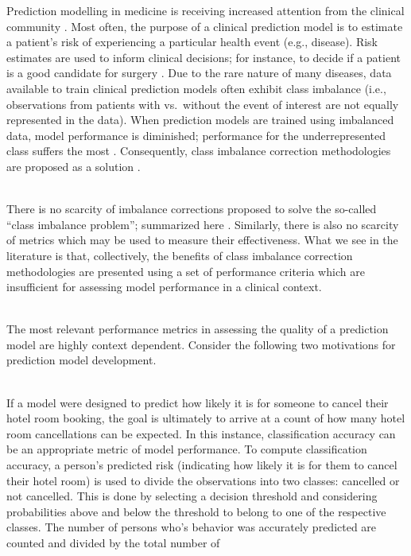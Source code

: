 \documentclass[AMA,STIX1COL,]{WileyNJD-v2}
\begin{document}
Prediction modelling in medicine is receiving increased attention from
the clinical community \citep{sandra}. Most often, the purpose of a
clinical prediction model is to estimate a patient's risk of
experiencing a particular health event (e.g., disease). Risk estimates
are used to inform clinical decisions; for instance, to decide if a
patient is a good candidate for surgery \citep{annals, achilles}. Due to
the rare nature of many diseases, data available to train clinical
prediction models often exhibit class imbalance (i.e., observations from
patients with vs.~without the event of interest are not equally
represented in the data). When prediction models are trained using
imbalanced data, model performance is diminished; performance for the
underrepresented class suffers the most \citep{cip, lp2}. Consequently,
class imbalance correction methodologies are proposed as a solution
\citep{cip, summary_m, lp, summary_h}.\\
\strut \\
There is no scarcity of imbalance corrections proposed to solve the
so-called ``class imbalance problem''; summarized here
\citep{summary_m, lp, summary_h}. Similarly, there is also no scarcity
of metrics which may be used to measure their effectiveness. What we see
in the literature is that, collectively, the benefits of class imbalance
correction methodologies are presented using a set of performance
criteria which are insufficient for assessing model performance in a
clinical context.\\
\strut \\
The most relevant performance metrics in assessing the quality of a
prediction model are highly context dependent. Consider the following
two motivations for prediction model development.\\
\strut \\
If a model were designed to predict how likely it is for someone to
cancel their hotel room booking, the goal is ultimately to arrive at a
count of how many hotel room cancellations can be expected. In this
instance, classification accuracy can be an appropriate metric of model
performance. To compute classification accuracy, a person's predicted
risk (indicating how likely it is for them to cancel their hotel room)
is used to divide the observations into two classes: cancelled or not
cancelled. This is done by selecting a decision threshold and
considering probabilities above and below the threshold to belong to one
of the respective classes. The number of persons who's behavior was
accurately predicted are counted and divided by the total number of
\end{document}

